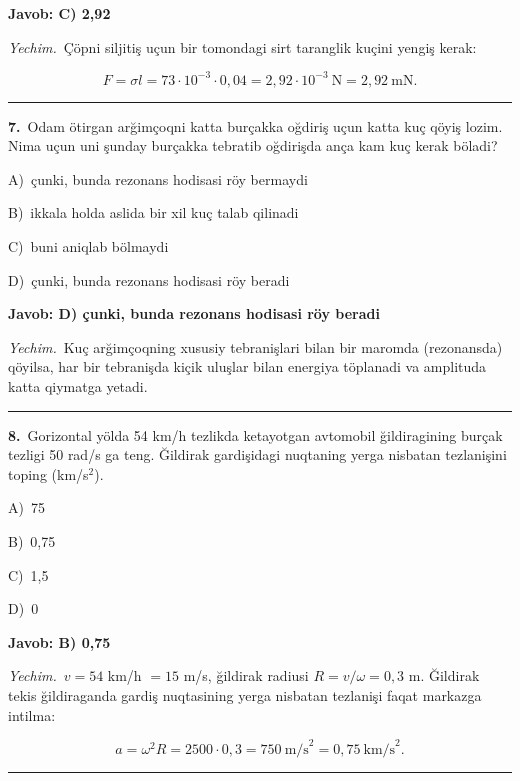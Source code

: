 \documentclass[11pt,a4paper]{article}
\newcommand{\opt}[2]{\hspace*{4mm}#1)\ #2\par}
\begin{document}
\noindent\colorbox{gray!12}{\parbox{\dimexpr\linewidth-2\fboxsep}{\textbf{Javob: C) 2,92}}}\par\smallskip
\noindent\textit{Yechim.}\ Çöpni siljitiş uçun bir tomondagi sirt taranglik kuçini yengiş kerak:\par
\[F=\sigma l=73\cdot10^{-3}\cdot0{,}04=2{,}92\cdot10^{-3}\ \text{N}=2{,}92\ \text{mN}.\]\par\medskip\hrule\medskip
{}\noindent\begin{minipage}{\linewidth}
\textbf{7.}\ Odam ötirgan arğimçoqni katta burçakka oğdiriş uçun katta kuç qöyiş lozim. Nima uçun uni şunday burçakka tebratib oğdirişda ança kam kuç kerak böladi?\par\smallskip
\opt{A}{çunki, bunda rezonans hodisasi röy bermaydi}
\opt{B}{ikkala holda aslida bir xil kuç talab qilinadi}
\opt{C}{buni aniqlab bölmaydi}
\opt{D}{çunki, bunda rezonans hodisasi röy beradi}
\end{minipage}\vspace{2pt}\par
\noindent\colorbox{gray!12}{\parbox{\dimexpr\linewidth-2\fboxsep}{\textbf{Javob: D) çunki, bunda rezonans hodisasi röy beradi}}}\par\smallskip
\noindent\textit{Yechim.}\ Kuç arğimçoqning xususiy tebranişlari bilan bir maromda (rezonansda) qöyilsa, har bir tebranişda kiçik uluşlar bilan energiya töplanadi va amplituda katta qiymatga yetadi.\par\par\medskip\hrule\medskip
{}\noindent\begin{minipage}{\linewidth}
\textbf{8.}\ Gorizontal yölda 54 km/h tezlikda ketayotgan avtomobil ğildiragining burçak tezligi 50 rad/s ga teng. Ğildirak gardişidagi nuqtaning yerga nisbatan tezlanişini toping (km/s$^{2}$).\par\smallskip
\opt{A}{75}
\opt{B}{0,75}
\opt{C}{1,5}
\opt{D}{0}
\end{minipage}\vspace{2pt}\par
\noindent\colorbox{gray!12}{\parbox{\dimexpr\linewidth-2\fboxsep}{\textbf{Javob: B) 0,75}}}\par\smallskip
\noindent\textit{Yechim.}\ $v=54$ km/h $=15$ m/s, ğildirak radiusi $R=v/\omega=0{,}3$ m. Ğildirak tekis ğildiraganda gardiş nuqtasining yerga nisbatan tezlanişi faqat markazga intilma:\par
\[a=\omega^2R=2500\cdot0{,}3=750\ \text{m/s}^2=0{,}75\ \text{km/s}^2.\]\par\medskip\hrule\medskip
\end{document}
